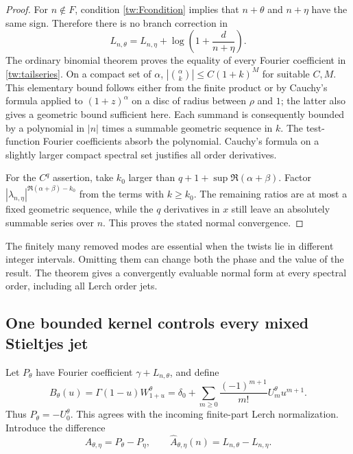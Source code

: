 \begin{proof}
For $n\notin F$, condition \eqref{tw:Fcondition} implies that
$n+\theta$ and $n+\eta$ have the same sign. Therefore there is no
branch correction in
\[
 L_{n,\theta}=L_{n,\eta}
             +\log\left(1+\frac{d}{n+\eta}\right).
\]
The ordinary binomial theorem proves the equality of every Fourier
coefficient in \eqref{tw:tailseries}. On a compact set of $\alpha$,
$|\binom\alpha k|\le C(1+k)^M$ for suitable $C,M$. This elementary
bound follows either from the finite product or by Cauchy's formula
applied to $(1+z)^\alpha$ on a disc of radius between $\rho$ and
$1$; the latter also gives a geometric bound sufficient here.
Each summand is consequently bounded by a polynomial in $|n|$
times a summable geometric sequence in $k$. The test-function Fourier
coefficients absorb the polynomial. Cauchy's formula on a slightly
larger compact spectral set justifies all order derivatives.

For the $C^q$ assertion, take $k_0$ larger than
$q+1+\sup\Re(\alpha+\beta)$. Factor
$|\lambda_{n,\eta}|^{\Re(\alpha+\beta)-k_0}$ from the terms
with $k\ge k_0$. The remaining ratios are at most a fixed geometric
sequence, while the $q$ derivatives in $x$ still leave an absolutely
summable series over $n$. This proves the stated normal convergence.
\end{proof}

The finitely many removed modes are essential when the twists lie in
different integer intervals. Omitting them can change both the phase and
the value of the result. The theorem gives a convergently evaluable
normal form at every spectral order, including all Lerch order jets.

\subsection{One bounded kernel controls every mixed Stieltjes jet}

Let $P_\theta$ have Fourier coefficient
$\gamma+L_{n,\theta}$, and define
\begin{equation}
 B_\theta(u)=\Gamma(1-u)W_{1+u}^{\theta}
   =\delta_0+\sum_{m\ge0}\frac{(-1)^{m+1}}{m!}
                         U_m^\theta u^{m+1}.
 \label{tw:B}
\end{equation}
Thus $P_\theta=-U_0^\theta$. This agrees with the incoming
finite-part Lerch normalization. Introduce the difference
\begin{equation}
 A_{\theta,\eta}=P_\theta-P_\eta,
 \qquad\widehat A_{\theta,\eta}(n)=L_{n,\theta}-L_{n,\eta}.
 \label{tw:A}
\end{equation}

